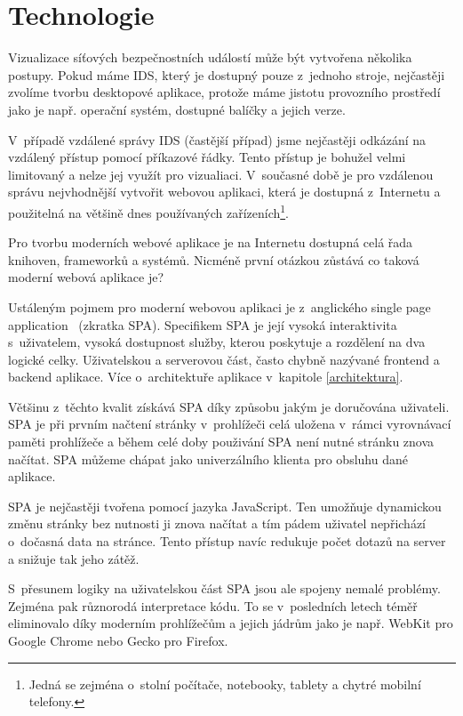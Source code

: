 
\chapter{Technologie}

Vizualizace síťových bezpečnostních událostí může být vytvořena několika postupy. Pokud máme IDS, který je dostupný pouze z~jednoho stroje, nejčastěji zvolíme tvorbu desktopové aplikace, protože máme jistotu provozního prostředí jako je např. operační systém, dostupné balíčky a jejich verze. 

V~případě vzdálené správy IDS (častější případ) jsme nejčastěji odkázání na vzdálený přístup pomocí příkazové řádky. Tento přístup je bohužel velmi limitovaný a nelze jej využít pro vizualiaci. V~současné době je pro vzdálenou správu nejvhodnější vytvořit webovou aplikaci, která je dostupná z~Internetu a použitelná na většině dnes používaných zařízeních\footnote{Jedná se zejména o~stolní počítače, notebooky, tablety a chytré mobilní telefony.}.

Pro tvorbu moderních webové aplikace je na Internetu dostupná celá řada knihoven, frameworků a systémů. Nicméně první otázkou zůstává co taková moderní webová aplikace je?

Ustáleným pojmem pro moderní webovou aplikaci je z~anglického single page application~\cite{spa} (zkratka SPA). Specifikem SPA je její vysoká interaktivita s~uživatelem, vysoká dostupnost služby, kterou poskytuje a rozdělení na dva logické celky. Uživatelskou a serverovou část, často chybně nazývané frontend a backend aplikace. Více o~architektuře aplikace v~kapitole \ref{architektura}.

Většinu z~těchto kvalit získává SPA díky způsobu jakým je doručována uživateli. SPA je při prvním načtení stránky v~prohlížeči celá uložena v~rámci vyrovnávací paměti prohlížeče a během celé doby použivání SPA není nutné stránku znova načítat. SPA můžeme chápat jako univerzálního klienta pro obsluhu dané aplikace. 

SPA je nejčastěji tvořena pomocí jazyka JavaScript. Ten umožňuje dynamickou změnu stránky bez nutnosti ji znova načítat a tím pádem uživatel nepřichází o~dočasná data na stránce. Tento přístup navíc redukuje počet dotazů na server a snižuje tak jeho zátěž.

S~přesunem logiky na uživatelskou část SPA jsou ale spojeny nemalé problémy. Zejména pak různorodá interpretace kódu. To se v~posledních letech téměř eliminovalo díky moderním prohlížečům a jejich jádrům jako je např. WebKit pro Google Chrome nebo Gecko pro Firefox.

